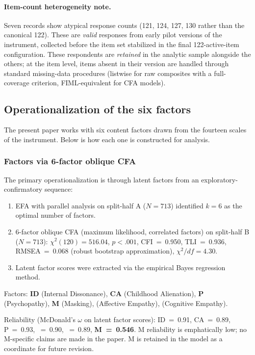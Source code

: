 \paragraph{Item-count heterogeneity note.} Seven records show atypical response counts (121, 124, 127, 130 rather than the canonical 122). These are \emph{valid} responses from early pilot versions of the instrument, collected before the item set stabilized in the final 122-active-item configuration. These respondents are \emph{retained} in the analytic sample alongside the others; at the item level, items absent in their version are handled through standard missing-data procedures (listwise for raw composites with a full-coverage criterion, FIML-equivalent for CFA models).

\subsection{Operationalization of the six factors}
\label{subsec:six_factor_ops}

The present paper works with six content factors drawn from the fourteen scales of the instrument. Below is how each one is constructed for analysis.

\subsubsection{Factors via 6-factor oblique CFA}

The primary operationalization is through latent factors from an exploratory-confirmatory sequence:
\begin{enumerate}
    \item EFA with parallel analysis on split-half A ($N = 713$) identified $k = 6$ as the optimal number of factors.
    \item 6-factor oblique CFA (maximum likelihood, correlated factors) on split-half B ($N = 713$): $\chi^2(120) = 516.04$, $p < .001$, CFI~=~0.950, TLI~=~0.936, RMSEA~=~0.068 (robust bootstrap approximation), $\chi^2/df = 4.30$.
    \item Latent factor scores were extracted via the empirical Bayes regression method.
\end{enumerate}

Factors: \textbf{ID} (Internal Dissonance), \textbf{CA} (Childhood Alienation), \textbf{P} (Psychopathy), \textbf{M} (Masking), \textbf{\EAF{}} (Affective Empathy), \textbf{\Ecog{}} (Cognitive Empathy).

Reliability (McDonald's $\omega$ on latent factor scores): ID~=~0.91, CA~=~0.89, P~=~0.93, \EAF{}~=~0.90, \Ecog{}~=~0.89, \textbf{M~=~0.546}. M reliability is emphatically low; no M-specific claims are made in the paper. M is retained in the model as a coordinate for future revision.

